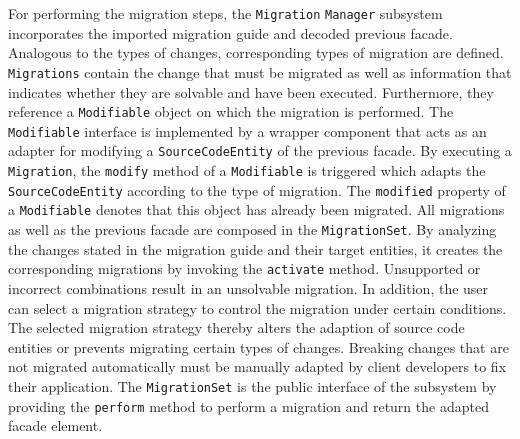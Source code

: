 For performing the migration steps, the \texttt{Migration} \texttt{Manager} subsystem incorporates the imported migration guide and decoded previous facade. Analogous to the types of changes, corresponding types of migration are defined. \texttt{Migrations} contain the change that must be migrated as well as information that indicates whether they are solvable and have been executed. Furthermore, they reference a \texttt{Modifiable} object on which the migration is performed. The \texttt{Modifiable} interface is implemented by a wrapper component that acts as an adapter for modifying a \texttt{SourceCodeEntity} of the previous facade. By executing a \texttt{Migration}, the \texttt{modify} method of a \texttt{Modifiable} is triggered which adapts the \texttt{SourceCodeEntity} according to the type of migration. The \texttt{mo\-di\-fied} property of a \texttt{Modifiable} denotes that this object has already been migrated. All migrations as well as the previous facade are composed in the \texttt{MigrationSet}. By analyzing the changes stated in the migration guide and their target entities, it creates the corresponding migrations by invoking the \texttt{ac\-ti\-vate} method. Unsupported or incorrect combinations result in an unsolvable migration. In addition, the user can select a migration strategy to control the migration under certain conditions. The selected migration strategy thereby alters the adaption of source code entities or prevents migrating certain types of changes. Breaking changes that are not migrated automatically must be manually adapted by client developers to fix their application. The \texttt{MigrationSet} is the public interface of the subsystem by providing the \texttt{perform} method to perform a migration and return the adapted facade element.

\begin{figure}[!h]
\end{figure}

